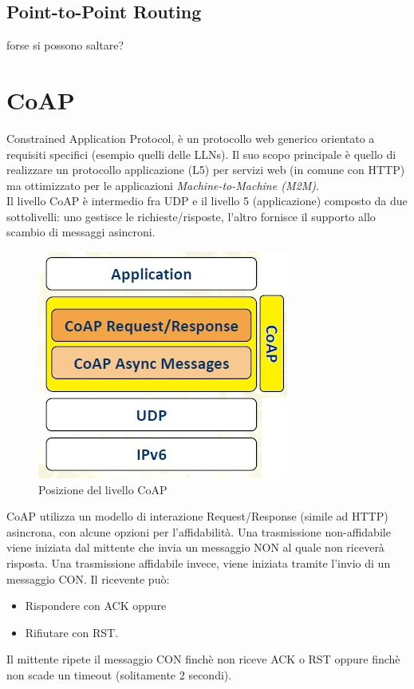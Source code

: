 \documentclass{article}
\begin{document}
\subsection{Point-to-Point Routing}
forse si possono saltare?

\newpage
\section{CoAP}
Constrained Application Protocol, è un protocollo web generico orientato a requisiti specifici (esempio quelli delle LLNs). Il suo scopo principale è quello di realizzare un protocollo applicazione (L5) per servizi web (in comune con HTTP) ma ottimizzato per le applicazioni \textit{Machine-to-Machine (M2M)}.\\
Il livello CoAP è intermedio fra UDP e il livello 5 (applicazione) composto da due sottolivelli: uno gestisce le richieste/risposte, l'altro fornisce il supporto allo scambio di messaggi asincroni.\\
\begin{figure}[H]
\centering
\includegraphics[scale=0.4]{figures/coaplayer.jpg}
\caption{Posizione del livello CoAP}
\end{figure}
CoAP utilizza un modello di interazione Request/Response (simile ad HTTP) asincrona, con alcune opzioni per l'affidabilità. Una trasmissione non-affidabile viene iniziata dal mittente che invia un messaggio NON al quale non riceverà risposta. Una trasmissione affidabile invece, viene iniziata tramite l'invio di un messaggio CON. Il ricevente può:
\begin{itemize}
    \item Rispondere con ACK oppure
    \item Rifiutare con RST.
\end{itemize}
Il mittente ripete il messaggio CON finchè non riceve ACK o RST oppure finchè non scade un timeout (solitamente 2 secondi).
\end{document}
